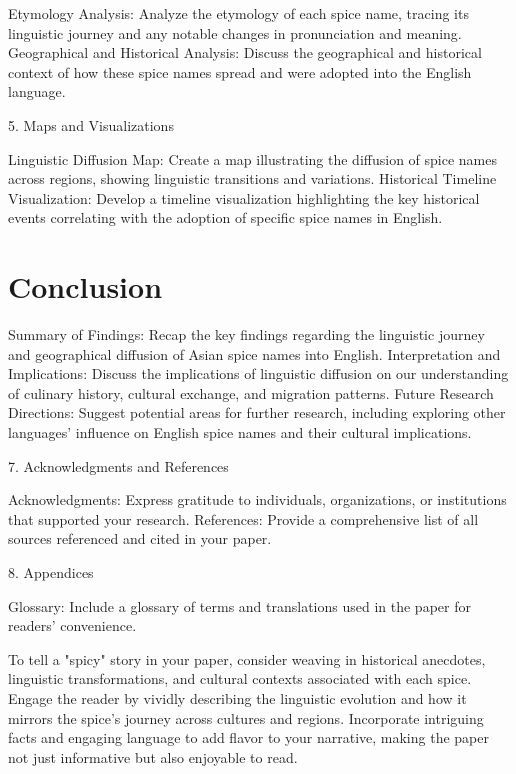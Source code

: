 \documentclass[12pt]{article}
\begin{document}
Etymology Analysis: Analyze the etymology of each spice name, tracing its linguistic journey and any notable changes in pronunciation and meaning.
Geographical and Historical Analysis: Discuss the geographical and historical context of how these spice names spread and were adopted into the English language.

5. Maps and Visualizations

Linguistic Diffusion Map: Create a map illustrating the diffusion of spice names across regions, showing linguistic transitions and variations.
Historical Timeline Visualization: Develop a timeline visualization highlighting the key historical events correlating with the adoption of specific spice names in English.

\section{Conclusion}

Summary of Findings: Recap the key findings regarding the linguistic journey and geographical diffusion of Asian spice names into English.
Interpretation and Implications: Discuss the implications of linguistic diffusion on our understanding of culinary history, cultural exchange, and migration patterns.
Future Research Directions: Suggest potential areas for further research, including exploring other languages' influence on English spice names and their cultural implications.

7. Acknowledgments and References

Acknowledgments: Express gratitude to individuals, organizations, or institutions that supported your research.
References: Provide a comprehensive list of all sources referenced and cited in your paper.

8. Appendices

Glossary: Include a glossary of terms and translations used in the paper for readers' convenience.

To tell a "spicy" story in your paper, consider weaving in historical anecdotes, linguistic transformations, and cultural contexts associated with each spice. Engage the reader by vividly describing the linguistic evolution and how it mirrors the spice's journey across cultures and regions. Incorporate intriguing facts and engaging language to add flavor to your narrative, making the paper not just informative but also enjoyable to read.



\printbibliography

\theendnotes
\end{document}
